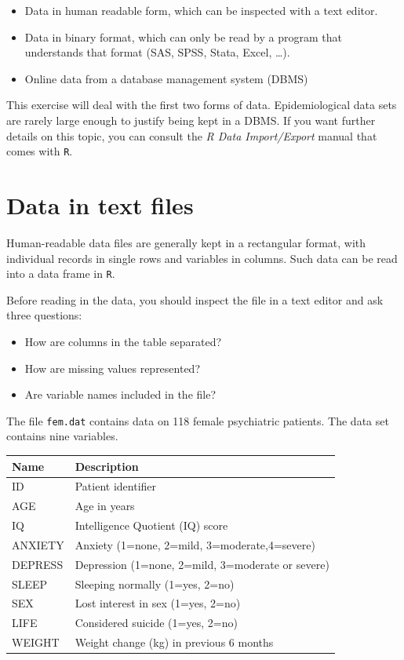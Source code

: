 \documentclass[
]{book}
\providecommand{\tightlist}{%
  \setlength{\itemsep}{0pt}\setlength{\parskip}{0pt}}
\begin{document}
\begin{itemize}
\tightlist
\item
  Data in human readable form, which can be inspected with a text editor.
\item
  Data in binary format, which can only be read by a program that
  understands that format (SAS, SPSS, Stata, Excel, \ldots).
\item
  Online data from a database management system (DBMS)
\end{itemize}

This exercise will deal with the first two forms of
data. Epidemiological data sets are rarely large enough to justify
being kept in a DBMS. If you want further details on this topic, you
can consult the \emph{R Data Import/Export} manual that comes with
\texttt{R}.

\section{Data in text files}\label{data-in-text-files}

Human-readable data files are generally kept in a rectangular format,
with individual records in single rows and variables in columns. Such
data can be read into a data frame in \texttt{R}.

Before reading in the data, you should inspect the file in a text
editor and ask three questions:

\begin{itemize}
\tightlist
\item
  How are columns in the table separated?
\item
  How are missing values represented?
\item
  Are variable names included in the file?
\end{itemize}

The file \texttt{fem.dat} contains data on 118 female psychiatric
patients. The data set contains nine variables.

\begin{longtable}[]{@{}ll@{}}
\toprule\noalign{}
Name & Description \\
\midrule\noalign{}
\endhead
\bottomrule\noalign{}
\endlastfoot
ID & Patient identifier \\
AGE & Age in years \\
IQ & Intelligence Quotient (IQ) score \\
ANXIETY & Anxiety (1=none, 2=mild, 3=moderate,4=severe) \\
DEPRESS & Depression (1=none, 2=mild, 3=moderate or severe) \\
SLEEP & Sleeping normally (1=yes, 2=no) \\
SEX & Lost interest in sex (1=yes, 2=no) \\
LIFE & Considered suicide (1=yes, 2=no) \\
WEIGHT & Weight change (kg) in previous 6 months \\
\end{longtable}
\end{document}
